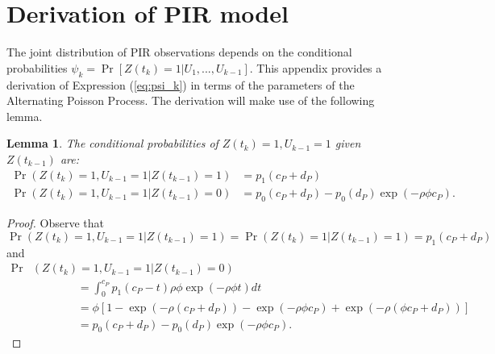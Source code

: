 \documentclass[man, noextraspace, floatsintext]{apa6}\usepackage[]{graphicx}\usepackage[]{color}
\newcommand{\bibfile}{C:/Users/jep2963/Documents/Bibliography/Behavioral_observation-APP}
\newtheorem{lemma}{Lemma}
\begin{document}


 
\appendix

\section{Derivation of PIR model}
\label{app:PIR_derivation}

The joint distribution of PIR observations depends on the conditional probabilities $\psi_k = \Pr\left[ Z(t_k) = 1 \left| U_1,...,U_{k-1}\right.\right]$. 
This appendix provides a derivation of Expression (\ref{eq:psi_k}) in terms of the parameters of the Alternating Poisson Process. The derivation will make use of the following lemma.

\begin{lemma}
\label{lemma1}
The conditional probabilities of $Z(t_k) = 1, U_{k-1} = 1$ given $Z(t_{k-1})$ are:
\begin{align*}
\Pr\left(Z(t_k) = 1, U_{k-1} = 1 \left| Z(t_{k-1}) = 1 \right.\right) &= p_1(c_P + d_P) \\
\Pr\left(Z(t_k) = 1, U_{k-1} = 1 \left| Z(t_{k-1}) = 0 \right.\right) &= p_0(c_P + d_P) - p_0(d_P) \exp\left(-\rho\phi c_P\right).
\end{align*}
\end{lemma}

\begin{proof}
Observe that \[
\Pr\left(Z(t_k) = 1, U_{k-1} = 1 \left| Z(t_{k-1}) = 1 \right.\right) = \Pr\left(Z(t_k) = 1 \left| Z(t_{k-1}) = 1 \right.\right) = p_1(c_P + d_P) \]
and \begin{align*}
\Pr &\left(Z(t_k) = 1, U_{k-1} = 1 \left| Z(t_{k-1}) = 0 \right.\right) \\
& \qquad \qquad = \int_0^{c_P} p_1(c_P - t) \rho \phi \exp\left(-\rho\phi t\right) dt \\
& \qquad \qquad  = \phi \left[ 1 - \exp\left(- \rho (c_P + d_P)\right) - \exp\left(-\rho\phi c_P\right) + \exp\left(- \rho (\phi c_P + d_P)\right)\right] \\
& \qquad \qquad = p_0(c_P + d_P) - p_0(d_P) \exp\left(-\rho\phi c_P\right).
\end{align*}
\end{proof}
\end{document}
